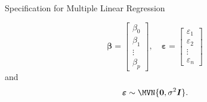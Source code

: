 \documentclass{article}\usepackage[]{graphicx}\usepackage[svgnames]{xcolor}
\providecommand{\RandomVector}[1]{\bm{#1}}%
\providecommand{\Vector}[1]{\bm{#1}}%
\providecommand{\Matrix}[1]{\bm{#1}}
\begin{document}
\begin{Regular}{Specification for Multiple Linear Regression}
\begin{itemize}
\[                        \Vector{\beta}=\begin{bmatrix}
                              \beta_0 \\
                              \beta_1 \\
                              \vdots  \\
                              \beta_p
                        \end{bmatrix},\quad
                        \RandomVector{\varepsilon}=\begin{bmatrix}
                              \varepsilon_1 \\
                              \varepsilon_2 \\
                              \vdots        \\
                              \varepsilon_n
                        \end{bmatrix} \]
                  and
                  \[ \RandomVector{\varepsilon}\sim \MVN{\Vector{0},\sigma^2\Matrix{I}}. \]
      \end{itemize}
\end{Regular}
\end{document}

